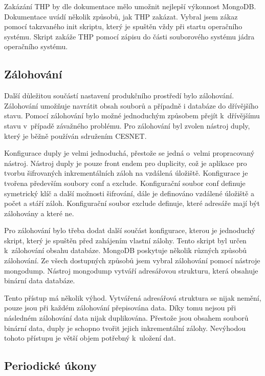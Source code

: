 \documentclass[thesis=M,czech]{FITthesis}[2012/06/26]
\begin{document}
      Zakázání THP by dle dokumentace mělo umožnit nejlepší výkonnost MongoDB.
      Dokumentace uvádí několik způsobů, jak THP zakázat.
      Vybral jsem zákaz pomocí takzvaného init skriptu, který je spuštěn vždy při startu operačního systému. 
      Skript zakáže THP pomocí zápisu do části souborového systému jádra operačního systému.
    
    \subsection{Zálohování}

      Další důležitou součástí nastavení produkčního prostředí bylo zálohování.
      Zálohování umožňuje navrátit obsah souborů a případně i databáze do dřívějšího stavu.
      Pomocí zálohování bylo možné jednoduchým způsobem přejít k~dřívějšímu stavu v~případě závažného problému.
      Pro zálohování byl zvolen nástroj duply, který je běžně používán sdružením CESNET.
      
      Konfigurace duply je velmi jednoduchá, přestože se jedná o~velmi propracovaný nástroj.
      Nástroj duply je pouze front endem pro duplicity,
      což je aplikace pro tvorbu šifrovaných inkrementálních záloh na vzdálená úložiště.\cite{duply}
      Konfigurace je tvořena především soubory conf a exclude.
      Konfigurační soubor conf definuje symetrický klíč a další možnosti šifrování,
      dále je definováno vzdálené úložiště a počet a stáří záloh.
      Konfigurační soubor exclude definuje, které adresáře mají být zálohovány a které ne.

      Pro zálohování bylo třeba dodat další součást konfigurace, kterou
      je jednoduchý skript, který je spuštěn před zahájením vlastní zálohy.
      Tento skript byl určen k~zálohování obsahu databáze.
      MongoDB poskytuje několik různých způsobů zálohování.
      Ze všech dostupných způsobů jsem vybral zálohování pomocí nástroje mongodump.
      Nástroj mongodump vytváří adresářovou strukturu, která obsahuje binární data databáze.
      
      Tento přístup má několik výhod.
      Vytvářená adresářová struktura se nijak nemění, pouze jsou při každém zálohování přepisována data.
      Díky tomu nejsou při následném zálohování data nijak duplikována.
      Přestože jsou obsahem souborů binární data, duply je schopno tvořit jejich inkrementální zálohy.
      Nevýhodou tohoto přístupu je větší objem potřebný k~uložení dat.

    \subsection{Periodické úkony}
      
\end{document}
